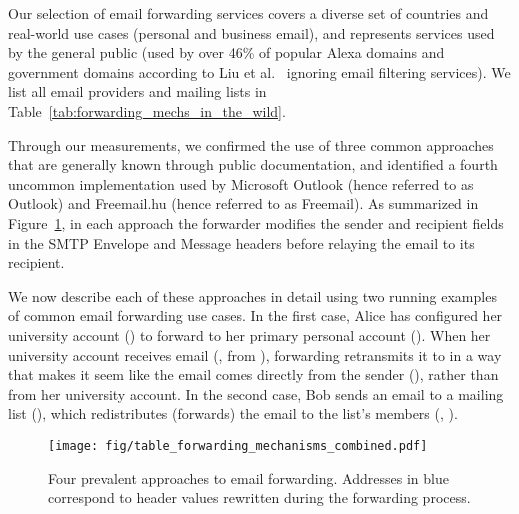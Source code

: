 Our selection of email forwarding services covers a diverse set of countries and real-world use cases (personal and business email), and represents services used by the general public (used by over 46\% of popular Alexa domains and government domains according to Liu et al.~\cite{liu2021s} ignoring email filtering services).
We list all email providers and mailing lists in Table~\ref{tab:forwarding_mechs_in_the_wild}.


Through our measurements, we confirmed the use of three common
approaches that are generally known through public documentation, and
identified a fourth uncommon implementation used by
Microsoft Outlook (hence referred to as Outlook) and Freemail.hu (hence referred to as Freemail).
As summarized in
Figure~\ref{fig:forwarding_mechs_combined}, in each approach the
forwarder modifies the sender and recipient fields in the SMTP
Envelope and Message headers before relaying the email to its
recipient.




We now describe each of these approaches in detail using two running
examples of common email forwarding use cases.  In the first case,
Alice has configured her university account () to
forward to her primary personal account ().  When
her university account receives email (\eg, from
), forwarding retransmits it to
 in a way that makes it seem like the email comes
directly from the sender (), rather than from her
university account.  In the second case, Bob sends an email to a
mailing list (), which redistributes (forwards) the
email to the list's members (\eg, ).


\begin{figure}[t]
  \centering
    \texttt{[image: fig/table\_forwarding\_mechanisms\_combined.pdf]}
    \caption{Four prevalent approaches to email forwarding.  Addresses
      in blue correspond to header values rewritten during the
      forwarding process.
      }
    \label{fig:forwarding_mechs_combined}
\end{figure}



